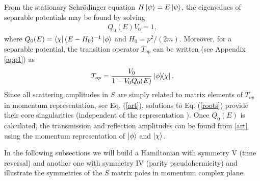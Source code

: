 From the stationary Schr\"{o}dinger equation $H \ket{\psi} = E \ket{\psi}$, the eigenvalues of separable potentials may be found by solving
%
\begin{eqnarray}
Q_{0}(E)V_{0} = 1,
\label{roots}
\end{eqnarray}
%
where $Q_{0}(E)=\bra{\chi}(E-H_0)^{-1}\ket{\phi}$ and $H_{0}=p^{2}/(2m)$. Moreover, for a separable potential, the transition operator $T_{op}$ can be written (see Appendix \ref{app1}) as
%
\begin{equation}
T_{op}=\frac{V_{0}}{1-V_{0} Q_{0}(E)} \ketbra{\phi}{\chi}.
\end{equation}
%
Since all scattering amplitudes in $S$ are simply related to matrix elements of $T_{op}$ in momentum representation, see
Eq. (\ref{art}), solutions to Eq. (\ref{roots}) provide their core singularities (independent of the representation \cite{Muga1996}).
Once $Q_{0}(E)$  is calculated, the transmission and reflection amplitudes can be found from \eqref{art}
using the momentum representation of $\ket{\phi}$ and $\ket{\chi}$.

In the following subsections we will build a Hamiltonian with symmetry V (time reversal) and another one with symmetry IV
(parity pseudohermicity) and illustrate the symmetries of the $S$ matrix poles in momentum complex plane.



%
%
%
%
%
